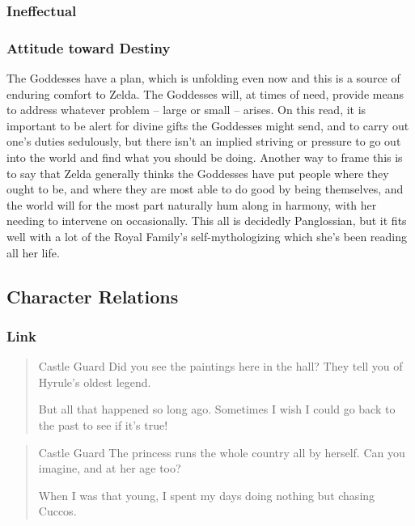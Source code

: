   \subsubsection{Ineffectual}
  \subsubsection{Attitude toward Destiny}The Goddesses have a plan, which is unfolding even now and this is a source of enduring comfort to Zelda. The Goddesses will, at times of need, provide means to address whatever problem -- large or small -- arises. On this read, it is important to be alert for divine gifts the Goddesses might send, and to carry out one's duties sedulously, but there isn't an implied striving or pressure to go out into the world and find what you should be doing. Another way to frame this is to say that Zelda generally thinks the Goddesses have put people where they ought to be, and where they are most able to do good by being themselves, and the world will for the most part naturally hum along in harmony, with her needing to intervene on occasionally. This all is decidedly Panglossian, but it fits well with a lot of the Royal Family's self-mythologizing which she's been reading all her life.
  \subsection{Character Relations}
  \subsubsection{Link}
  \begin{quote}Castle Guard
  Did you see the paintings here in the hall? They tell you of Hyrule’s oldest legend.

  But all that happened so long ago. Sometimes I wish I could go back to the past to see if it’s true!\end{quote}

  \begin{quote}
  Castle Guard
  The princess runs the whole country all by herself. Can you imagine, and at her age too?

  When I was that young, I spent my days doing nothing but chasing Cuccos. 
  \end{quote}

